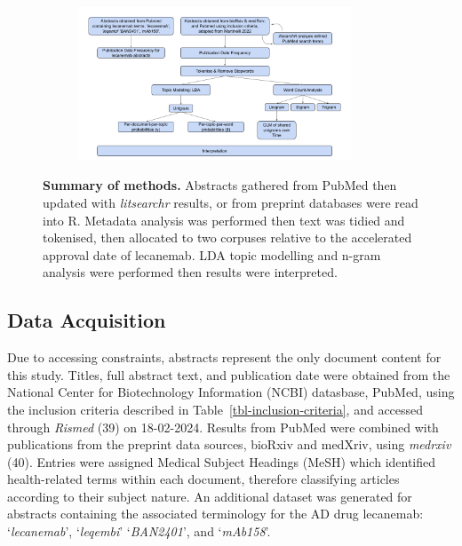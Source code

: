 \documentclass[
  a4paper,
]{article}
\begin{document}
\begin{figure}

{\centering 

\begin{figure}[H]

{\centering \includegraphics[width=3.2in,height=\textheight]{data/methodsummary.png}

}

\end{figure}

}

\caption{\label{fig-full-summary}\textbf{Summary of methods.} Abstracts
gathered from PubMed then updated with \emph{litsearchr} results, or
from preprint databases were read into R. Metadata analysis was
performed then text was tidied and tokenised, then allocated to two
corpuses relative to the accelerated approval date of lecanemab. LDA
topic modelling and n-gram analysis were performed then results were
interpreted.}

\end{figure}

\hypertarget{data-acquisition}{%
\subsection{Data Acquisition}\label{data-acquisition}}

Due to accessing constraints, abstracts represent the only document
content for this study. Titles, full abstract text, and publication date
were obtained from the National Center for Biotechnology Information
(NCBI) datasbase, PubMed, using the inclusion criteria described in
Table~\ref{tbl-inclusion-criteria}, and accessed through \emph{Rismed}
(39) on 18-02-2024. Results from PubMed were combined with publications
from the preprint data sources, bioRxiv and medXriv, using
\emph{medrxiv} (40). Entries were assigned Medical Subject Headings
(MeSH) which identified health-related terms within each document,
therefore classifying articles according to their subject nature. An
additional dataset was generated for abstracts containing the associated
terminology for the AD drug lecanemab: `\emph{lecanemab}',
`\emph{leqembi}' `\emph{BAN2401}', and `\emph{mAb158}'.
\end{document}
